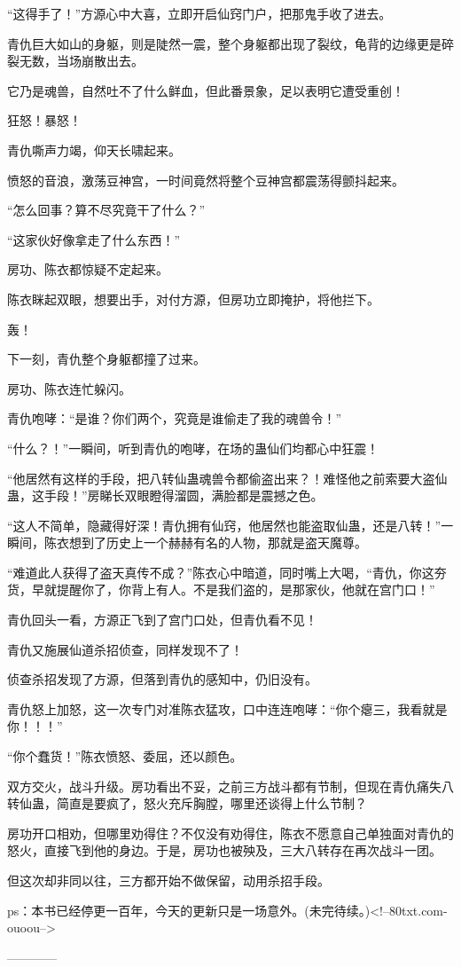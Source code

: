 \begin{this_body}
“这得手了！”方源心中大喜，立即开启仙窍门户，把那鬼手收了进去。

青仇巨大如山的身躯，则是陡然一震，整个身躯都出现了裂纹，龟背的边缘更是碎裂无数，当场崩散出去。

它乃是魂兽，自然吐不了什么鲜血，但此番景象，足以表明它遭受重创！

狂怒！暴怒！

青仇嘶声力竭，仰天长啸起来。

愤怒的音浪，激荡豆神宫，一时间竟然将整个豆神宫都震荡得颤抖起来。

“怎么回事？算不尽究竟干了什么？”

“这家伙好像拿走了什么东西！”

房功、陈衣都惊疑不定起来。

陈衣眯起双眼，想要出手，对付方源，但房功立即掩护，将他拦下。

轰！

下一刻，青仇整个身躯都撞了过来。

房功、陈衣连忙躲闪。

青仇咆哮：“是谁？你们两个，究竟是谁偷走了我的魂兽令！”

“什么？！”一瞬间，听到青仇的咆哮，在场的蛊仙们均都心中狂震！

“他居然有这样的手段，把八转仙蛊魂兽令都偷盗出来？！难怪他之前索要大盗仙蛊，这手段！”房睇长双眼瞪得溜圆，满脸都是震撼之色。

“这人不简单，隐藏得好深！青仇拥有仙窍，他居然也能盗取仙蛊，还是八转！”一瞬间，陈衣想到了历史上一个赫赫有名的人物，那就是盗天魔尊。

“难道此人获得了盗天真传不成？”陈衣心中暗道，同时嘴上大喝，“青仇，你这夯货，早就提醒你了，你背上有人。不是我们盗的，是那家伙，他就在宫门口！”

青仇回头一看，方源正飞到了宫门口处，但青仇看不见！

青仇又施展仙道杀招侦查，同样发现不了！

侦查杀招发现了方源，但落到青仇的感知中，仍旧没有。

青仇怒上加怒，这一次专门对准陈衣猛攻，口中连连咆哮：“你个瘪三，我看就是你！！！”

“你个蠢货！”陈衣愤怒、委屈，还以颜色。

双方交火，战斗升级。房功看出不妥，之前三方战斗都有节制，但现在青仇痛失八转仙蛊，简直是要疯了，怒火充斥胸膛，哪里还谈得上什么节制？

房功开口相劝，但哪里劝得住？不仅没有劝得住，陈衣不愿意自己单独面对青仇的怒火，直接飞到他的身边。于是，房功也被殃及，三大八转存在再次战斗一团。

但这次却非同以往，三方都开始不做保留，动用杀招手段。

ps：本书已经停更一百年，今天的更新只是一场意外。(未完待续。)<!--80txt.com-ouoou-->

------------

\end{this_body}

